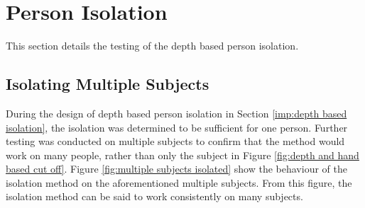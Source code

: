 \section{Person Isolation}
\label{testing:person isolation}
This section details the testing of the depth based person isolation.\\

\subsection{Isolating Multiple Subjects}
During the design of depth based person isolation in Section \ref{imp:depth based isolation}, the isolation was determined to be sufficient for one person. Further testing was conducted on multiple subjects to confirm that the method would work on many people, rather than only the subject in Figure \ref{fig:depth and hand based cut off}. Figure \ref{fig:multiple subjects isolated} show the behaviour of the isolation method on the aforementioned multiple subjects. From this figure, the isolation method can be said to work consistently on many subjects.\\

